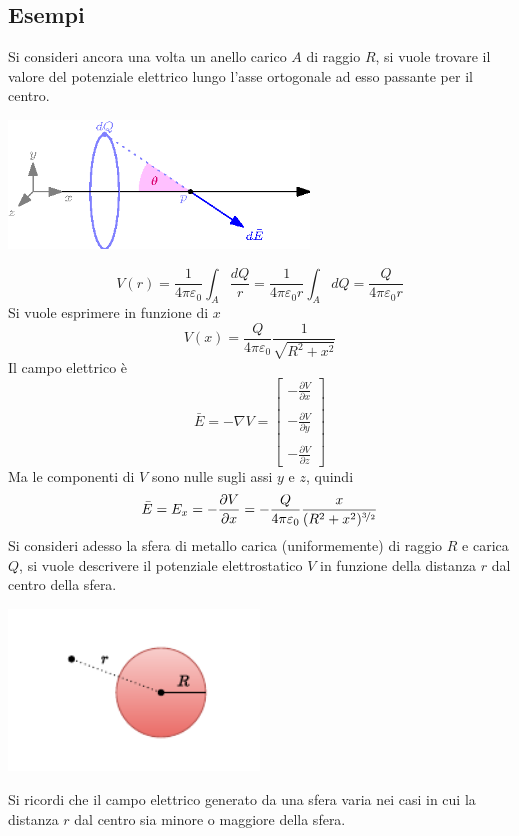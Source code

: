 \documentclass[10pt, letterpaper]{report}
\begin{document}
\subsection{Esempi}
Si consideri ancora una volta un anello carico $A$ di raggio $R$, si vuole trovare il valore del potenziale elettrico lungo l'asse ortogonale ad esso passante per il centro.
\begin{center}
    \includegraphics[width=0.6\textwidth]{images/anello1.eps}
\end{center}
$$ V(r)=\frac{1}{4\pi\varepsilon_0}\int_A \frac{dQ}{r}=\frac{1}{4\pi\varepsilon_0r}\int_A dQ=\frac{Q}{4\pi\varepsilon_0r}$$
Si vuole esprimere in funzione di $x$
$$ V(x)=\frac{Q}{4\pi\varepsilon_0}\frac{1}{\sqrt{R^2+x^2}}$$
Il campo elettrico è 
$$ \bar E = -\nabla V = \begin{bmatrix}
    -\frac{\partial V}{\partial x}\\\\
    -\frac{\partial V}{\partial y}\\\\
   -\frac{\partial V}{\partial z}
\end{bmatrix}$$
Ma le componenti di $V$ sono nulle sugli assi $y$ e $z$, quindi 
$$ \bar E = E_x=-\frac{\partial V}{\partial x}=-\frac{Q}{4\pi\varepsilon_0} \frac{x}{(R^2+x^2)^{\nicefrac{3}{2}}} $$
Si consideri adesso la sfera di metallo carica (uniformemente) di raggio $R$ e carica $Q$, si vuole descrivere il potenziale elettrostatico $V$ in funzione della distanza $r$ dal centro della sfera.\begin{center}
    \includegraphics[width=0.5\textwidth]{images/sferaCarica2.pdf}
\end{center}
Si ricordi che il campo elettrico generato da una sfera varia nei casi in cui la distanza $r$ dal centro sia minore o maggiore della sfera. 
\end{document}
